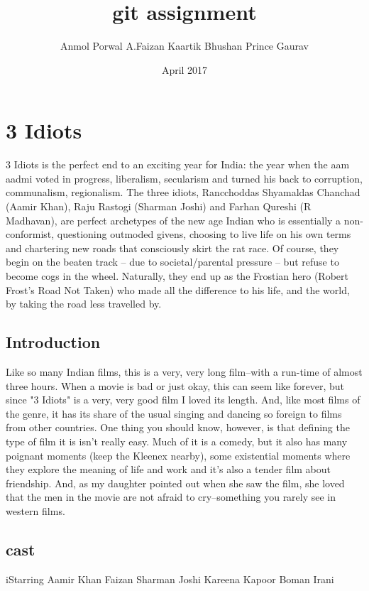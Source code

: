 \documentclass{article}
\title{git assignment}
\author{Anmol Porwal A.Faizan Kaartik Bhushan Prince Gaurav }
\date{April 2017}
\begin{document}
\maketitle

\section{3 Idiots}
3 Idiots is the perfect end to an exciting year for India: the year when the aam aadmi voted in progress, liberalism, secularism and turned his back to corruption, communalism, regionalism. The three idiots, Rancchoddas Shyamaldas Chanchad (Aamir Khan), Raju Rastogi (Sharman Joshi) and Farhan Qureshi (R Madhavan), are perfect archetypes of the new age Indian who is essentially a non-conformist, questioning outmoded givens, choosing to live life on his own terms and chartering new roads that consciously skirt the rat race. Of course, they begin on the beaten track -- due to societal/parental pressure -- but refuse to become cogs in the wheel. Naturally, they end up as the Frostian hero (Robert Frost's Road Not Taken) who made all the difference to his life, and the world, by taking the road less travelled by.

\subsection{Introduction}
Like so many Indian films, this is a very, very long film--with a run-time of almost three hours. When a movie is bad or just okay, this can seem like forever, but since "3 Idiots" is a very, very good film I loved its length. And, like most films of the genre, it has its share of the usual singing and dancing so foreign to films from other countries. One thing you should know, however, is that defining the type of film it is isn't really easy. Much of it is a comedy, but it also has many poignant moments (keep the Kleenex nearby), some existential moments where they explore the meaning of life and work and it's also a tender film about friendship. And, as my daughter pointed out when she saw the film, she loved that the men in the movie are not afraid to cry--something you rarely see in western films.


\subsection{cast}
iStarring	
Aamir Khan
Faizan
Sharman Joshi
Kareena Kapoor
Boman Irani
\end{document}

